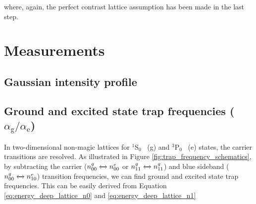 \documentclass[bibnotes]{article}
\newcommand{\SLJ}[3]{{\ensuremath{{^{#1}}\mathrm{#2}_{#3}}}}
\newcommand{\TPZ}{\SLJ{3}{P}{0} \ }
\newcommand{\SSZ}{\SLJ{1}{S}{0} \ }
\begin{document}
	\noindent where, again, the perfect contrast lattice assumption has been made in the last step. 









\section{Measurements}
	\subsection{Gaussian intensity profile}
	\subsection{Ground and excited state trap frequencies ($\alpha_{\text{g}}/\alpha_{\text{e}}$)}

		In two-dimensional non-magic lattices for \SSZ (g) and \TPZ (e) states, the carrier transitions are resolved. As illustrated in Figure \ref{fig:trap_frequency_schematics}, by subtracting the carrier ($n^{g}_{00}\xleftrightarrow{} n^{e}_{00}$ or $n^{g}_{11}\xleftrightarrow{} n^{g}_{11}$) and blue sideband ($n^{g}_{00}\xleftrightarrow{} n^{e}_{10}$) transition frequencies, we can find ground and excited state trap frequencies. This can be easily derived from Equation \ref{eq:energy_deep_lattice_n0} and \ref{eq:energy_deep_lattice_n1}
\end{document}

